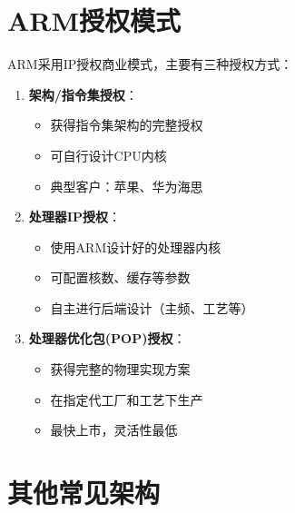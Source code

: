 \documentclass[12pt,UTF8]{ctexbook}
\begin{document}
\section{ARM授权模式}

ARM采用IP授权商业模式，主要有三种授权方式：

\begin{enumerate}
    \item \textbf{架构/指令集授权}：
    \begin{itemize}[leftmargin=2em]
        \item 获得指令集架构的完整授权
        \item 可自行设计CPU内核
        \item 典型客户：苹果、华为海思
    \end{itemize}
    
    \item \textbf{处理器IP授权}：
    \begin{itemize}[leftmargin=2em]
        \item 使用ARM设计好的处理器内核
        \item 可配置核数、缓存等参数
        \item 自主进行后端设计（主频、工艺等）
    \end{itemize}
    
    \item \textbf{处理器优化包(POP)授权}：
    \begin{itemize}[leftmargin=2em]
        \item 获得完整的物理实现方案
        \item 在指定代工厂和工艺下生产
        \item 最快上市，灵活性最低
    \end{itemize}
\end{enumerate}

\section{其他常见架构}
\end{document}
